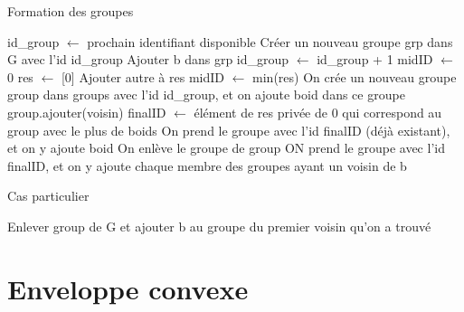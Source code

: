 \documentclass{article}
\begin{document}
\begin{algorithm}[H]
    \caption{Formation des groupes}
    \begin{algorithmic}
        \STATE id\_group $\leftarrow$ prochain identifiant disponible 
        \medbreak
        \STATE Créer un nouveau groupe grp dans G avec l'id id\_group
        \STATE Ajouter b dans grp
        \STATE id\_group $\leftarrow$ id\_group + 1
        \ENDIF
        \medbreak
        \STATE midID $\leftarrow$ 0
        \STATE res $\leftarrow$ [0] 
        \medbreak
        \STATE Ajouter autre à res
        \ENDIF
        \STATE midID $\leftarrow$ min(res)
        \ENDFOR
        \medbreak
        \STATE On crée un nouveau groupe group dans groups avec l’id id\_group, et on ajoute boid dans ce groupe
        \STATE group.ajouter(voisin)
        \ENDFOR
        \ENDIF
        \medbreak
        \STATE finalID $\leftarrow$ élément de res privée de 0 qui correspond au group avec le plus de boids
        \STATE On prend le groupe avec l’id finalID (déjà existant), et on y ajoute boid
        \medbreak
        \STATE On enlève le groupe de group
        \STATE ON prend le groupe avec l'id finalID, et on y ajoute chaque membre des groupes ayant un voisin de b
        \ENDFOR
        \ENDIF
        \ENDIF
        \ENDFOR
    \end{algorithmic}
\end{algorithm}

\begin{algorithm}[H]
    \caption{Cas particulier}
    \begin{algorithmic}
        \medbreak
        \STATE Enlever group de G et ajouter b au groupe du premier voisin qu'on a trouvé
        \ENDIF
        \ENDIF
        \ENDFOR
        \STATE
    \end{algorithmic}
\end{algorithm}



\section{Enveloppe convexe}
\end{document}

